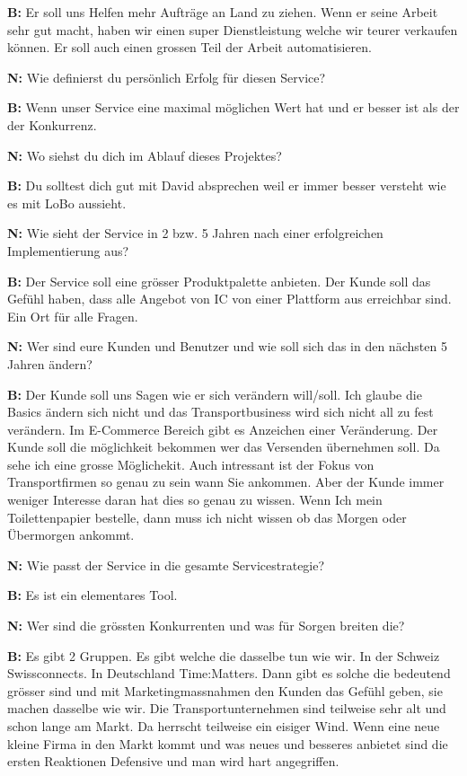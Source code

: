 \textbf{B:} Er soll uns Helfen mehr Aufträge an Land zu ziehen. Wenn er seine Arbeit sehr gut macht, haben wir einen super Dienstleistung welche wir teurer verkaufen können. Er soll auch einen grossen Teil der Arbeit automatisieren.

\textbf{N:} Wie definierst du persönlich Erfolg für diesen Service?

\textbf{B:} Wenn unser Service eine maximal möglichen Wert hat und er besser ist als der der Konkurrenz.

\textbf{N:} Wo siehst du dich im Ablauf dieses Projektes?

\textbf{B:} Du solltest dich gut mit David absprechen weil er immer besser versteht wie es mit LoBo aussieht.

\textbf{N:} Wie sieht der Service in 2 bzw. 5 Jahren nach einer erfolgreichen Implementierung aus?

\textbf{B:} Der Service soll eine grösser Produktpalette anbieten. Der Kunde soll das Gefühl haben, dass alle Angebot von IC von einer Plattform aus erreichbar sind. Ein Ort für alle Fragen.

\textbf{N:} Wer sind eure Kunden und Benutzer und wie soll sich das in den nächsten 5 Jahren ändern?

\textbf{B:} Der Kunde soll uns Sagen wie er sich verändern will/soll. Ich glaube die Basics ändern sich nicht und das Transportbusiness wird sich nicht all zu fest verändern. Im E-Commerce Bereich gibt es Anzeichen einer Veränderung. Der Kunde soll die möglichkeit bekommen wer das Versenden übernehmen soll. Da sehe ich eine grosse Möglichekit. Auch intressant ist der Fokus von Transportfirmen so genau zu sein wann Sie ankommen. Aber der Kunde immer weniger Interesse daran hat dies so genau zu wissen. Wenn Ich mein Toilettenpapier bestelle, dann muss ich nicht wissen ob das Morgen oder Übermorgen ankommt.

\textbf{N:} Wie passt der Service in die gesamte Servicestrategie?

\textbf{B:} Es ist ein elementares Tool.

\textbf{N:} Wer sind die grössten Konkurrenten und was für Sorgen breiten die?

\textbf{B:} Es gibt 2 Gruppen. Es gibt welche die dasselbe tun wie wir. In der Schweiz Swissconnects. In Deutschland Time:Matters. Dann gibt es solche die bedeutend grösser sind und mit Marketingmassnahmen den Kunden das Gefühl geben, sie machen dasselbe wie wir. Die Transportunternehmen sind teilweise sehr alt und schon lange am Markt. Da herrscht teilweise ein eisiger Wind. Wenn eine neue kleine Firma in den Markt kommt und was neues und besseres anbietet sind die ersten Reaktionen Defensive und man wird hart angegriffen.

